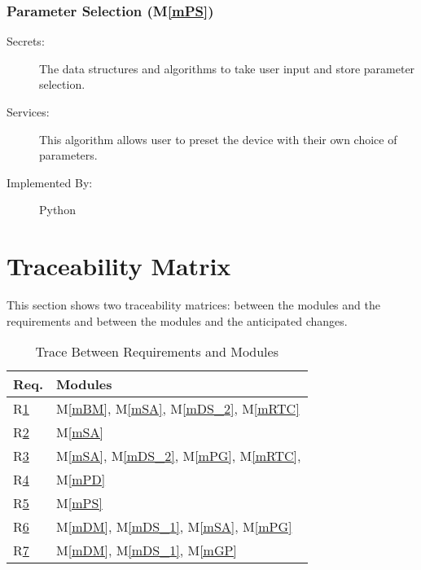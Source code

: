\documentclass[12pt, titlepage]{article}
\newcommand{\mref}[1]{M\ref{#1}}
\begin{document}
\subsubsection{Parameter Selection (\mref{mPS})}

\begin{description}
  \item[Secrets:] The data structures and algorithms to take user input and store parameter selection.
  \item[Services:] This algorithm allows user to preset the device with their own choice of parameters.
  \item[Implemented By:] Python
\end{description}

\section{Traceability Matrix} \label{SecTM}

This section shows two traceability matrices: between the modules and the
requirements and between the modules and the anticipated changes.

\begin{table}[H]
  \centering
  \begin{tabular}{p{} p{}}
    \toprule
    \textbf{Req.} & \textbf{Modules}                                                                           \\
    \midrule
    R\href{https://github.com/zakerl/Capstone_Project/blob/main/docs/SRS/SRS.pdf}{1}            & \mref{mBM}, \mref{mSA}, \mref{mDS_2}, \mref{mRTC}                               \\
    R\href{https://github.com/zakerl/Capstone_Project/blob/main/docs/SRS/SRS.pdf}{2}            & \mref{mSA} \\
    R\href{https://github.com/zakerl/Capstone_Project/blob/main/docs/SRS/SRS.pdf}{3}            & \mref{mSA}, \mref{mDS_2}, \mref{mPG}, \mref{mRTC},                                                                             \\
    R\href{https://github.com/zakerl/Capstone_Project/blob/main/docs/SRS/SRS.pdf}{4}            & \mref{mPD}                                                    \\
    R\href{https://github.com/zakerl/Capstone_Project/blob/main/docs/SRS/SRS.pdf}{5}            & \mref{mPS} \\
    R\href{https://github.com/zakerl/Capstone_Project/blob/main/docs/SRS/SRS.pdf}{6}            & \mref{mDM}, \mref{mDS_1}, \mref{mSA}, \mref{mPG}\\
    R\href{https://github.com/zakerl/Capstone_Project/blob/main/docs/SRS/SRS.pdf}{7}           & \mref{mDM}, \mref{mDS_1}, \mref{mGP}             \\
    \bottomrule
  \end{tabular}
  \caption{Trace Between Requirements and Modules}
  \label{TblRT}
\end{table}
\end{document}
